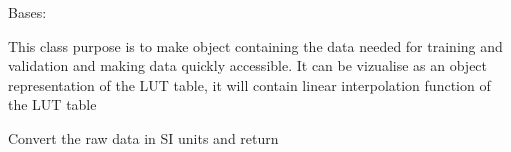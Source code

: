 \documentclass[letterpaper,10pt,english]{sphinxmanual}
\begin{document}
\begin{fulllineitems}
\label{\detokenize{CHF_model_api:CHF_model_api.dataBase.MyDB}}
\pysigstartsignatures
{}
\pysigstopsignatures
\sphinxAtStartPar
Bases: 

\sphinxAtStartPar
This class purpose is to make object containing the data needed 
for training and validation and making data quickly accessible.
It can be vizualise as an object representation of the LUT table, 
it will contain linear interpolation function of the LUT table

\begin{fulllineitems}
\label{\detokenize{CHF_model_api:CHF_model_api.dataBase.MyDB.AVAILABLE_DB}}
\pysigstartsignatures
{}
\pysigstopsignatures
\end{fulllineitems}


\begin{fulllineitems}
\label{\detokenize{CHF_model_api:CHF_model_api.dataBase.MyDB.ISUnitsTransformation}}
\pysigstartsignatures
{}
\pysigstopsignatures
\sphinxAtStartPar
Convert the raw data in SI units and return

\end{fulllineitems}



\end{fulllineitems}
\end{document}
